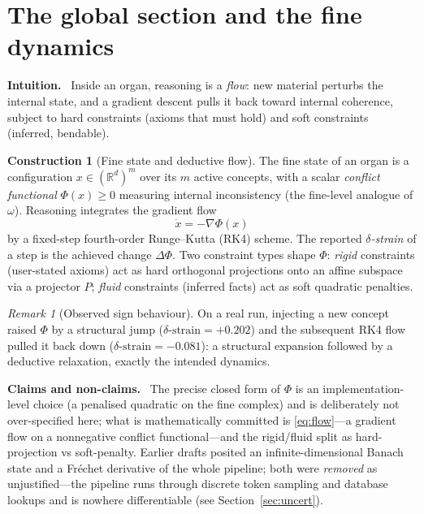 \documentclass[11pt]{article}
\theoremstyle{definition}
\newtheorem{construction}[definition]{Construction}
\theoremstyle{plain}
\theoremstyle{remark}
\newtheorem{remark}[definition]{Remark}
\newcommand{\Intu}{\noindent\textbf{\color{intuitioncol}Intuition.}\ }
\newcommand{\Hon}{\noindent\textbf{\color{honestycol}Claims and non-claims.}\ }
\newcommand{\Rd}{\mathbb{R}^{d}}
\begin{document}
\section{The global section and the fine dynamics}\label{sec:fine}

\begin{intu}\Intu
Inside an organ, reasoning is a \emph{flow}: new material perturbs the internal state,
and a gradient descent pulls it back toward internal coherence, subject to hard
constraints (axioms that must hold) and soft constraints (inferred, bendable).
\end{intu}

\begin{construction}[Fine state and deductive flow]\label{con:flow}
The fine state of an organ is a configuration $x\in(\Rd)^{m}$ over its $m$ active
concepts, with a scalar \emph{conflict functional} $\Phi(x)\ge0$ measuring internal
inconsistency (the fine-level analogue of $\omega$). Reasoning integrates the gradient
flow
\begin{equation}\label{eq:flow}
\dot x=-\nabla\Phi(x)
\end{equation}
by a fixed-step fourth-order Runge--Kutta (RK4) scheme. The reported
\emph{$\delta$-strain} of a step is the achieved change $\Delta\Phi$. Two constraint
types shape $\Phi$: \emph{rigid} constraints (user-stated axioms) act as hard
orthogonal projections onto an affine subspace via a projector $P$; \emph{fluid}
constraints (inferred facts) act as soft quadratic penalties.
\end{construction}

\begin{remark}[Observed sign behaviour]
On a real run, injecting a new concept raised $\Phi$ by a structural jump
($\delta\text{-strain}=+0.202$) and the subsequent RK4 flow pulled it back down
($\delta\text{-strain}=-0.081$): a structural expansion followed by a deductive
relaxation, exactly the intended dynamics.
\end{remark}

\begin{hon}\Hon
The precise closed form of $\Phi$ is an implementation-level choice (a penalised
quadratic on the fine complex) and is deliberately not over-specified here; what is
mathematically committed is \eqref{eq:flow}---a gradient flow on a nonnegative
conflict functional---and the rigid/fluid split as hard-projection vs soft-penalty.
Earlier drafts posited an infinite-dimensional Banach state and a Fréchet derivative
of the whole pipeline; both were \emph{removed} as unjustified---the pipeline runs
through discrete token sampling and database lookups and is nowhere differentiable
(see Section~\ref{sec:uncert}).
\end{hon}
\end{document}

